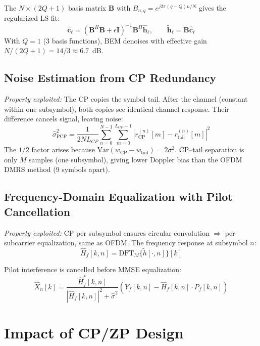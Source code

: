 \documentclass[11pt,a4paper,twoside]{article}
\newcommand{\nest}{\hat{\sigma}^2}
\newcommand{\B}{\mathbf{B}}
\newcommand{\I}{\mathbf{I}}
\begin{document}
The $N \times (2Q{+}1)$ basis matrix $\B$ with $B_{n,q} = e^{j2\pi(q-Q)n/N}$ gives the regularized LS fit:
\begin{equation}
    \hat{\mathbf{c}}_\ell = (\B^H\B + \epsilon\I)^{-1} \B^H \hat{\mathbf{h}}_\ell, \qquad \tilde{\mathbf{h}}_\ell = \B \hat{\mathbf{c}}_\ell
\end{equation}
With $Q = 1$ (3 basis functions), BEM denoises with effective gain $N/(2Q{+}1) = 14/3 \approx 6.7$~dB.

\subsection{Noise Estimation from CP Redundancy}

\textit{Property exploited:} The CP copies the symbol tail. After the channel (constant within one subsymbol), both copies see identical channel response. Their difference cancels signal, leaving noise:
\begin{equation}
    \boxed{\nest_{\text{PCP}} = \frac{1}{2 N L_{CP}} \sum_{n=0}^{N-1} \sum_{m=0}^{L_{CP}-1} |r_{\text{CP}}^{(n)}[m] - r_{\text{tail}}^{(n)}[m]|^2}
    \label{eq:noise_pcp}
\end{equation}
The $1/2$ factor arises because $\text{Var}(w_{\text{CP}} - w_{\text{tail}}) = 2\sigma^2$. CP--tail separation is only $M$ samples (one subsymbol), giving lower Doppler bias than the OFDM DMRS method (9 symbols apart).

\subsection{Frequency-Domain Equalization with Pilot Cancellation}

\textit{Property exploited:} CP per subsymbol ensures circular convolution $\Rightarrow$ per-subcarrier equalization, same as OFDM. The frequency response at subsymbol $n$:
\begin{equation}
    \hat{H}_f[k, n] = \text{DFT}_M\{\tilde{h}[\cdot, n]\}[k]
\end{equation}

Pilot interference is cancelled before MMSE equalization:
\begin{equation}
    \hat{X}_n[k] = \frac{\hat{H}_f^*[k,n]}{|\hat{H}_f[k,n]|^2 + \nest} \left(Y_f[k,n] - \hat{H}_f[k,n] \cdot P_f[k,n]\right)
\end{equation}

\section{Impact of CP/ZP Design}
\label{sec:cp_design}
\end{document}
